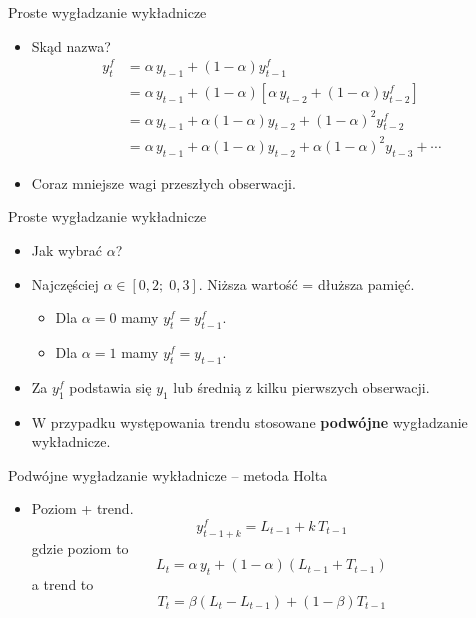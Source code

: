 \documentclass[11pt,usenames,dvipsnames,aspectratio=169]{beamer}
\begin{document}
\begin{frame}{Proste wygładzanie wykładnicze}
\begin{itemize}
    \item Skąd nazwa?
    \begin{align*}
    y_{t}^{f} &= \alpha\, y_{t-1}+\left(1-\alpha\right)y_{t-1}^{f}\\
     &= \alpha\, y_{t-1}+\left(1-\alpha\right)\!\left[\alpha\, y_{t-2}+\left(1-\alpha\right)y_{t-2}^{f}\right]\\
     &= \alpha\, y_{t-1}+\alpha\left(1-\alpha\right)y_{t-2}+\left(1-\alpha\right)^{2}y_{t-2}^{f}\\
     &= \alpha\, y_{t-1}+\alpha\left(1-\alpha\right)y_{t-2}+\alpha\left(1-\alpha\right)^{2}y_{t-3}+\cdots
    \end{align*}
    \item Coraz mniejsze wagi przeszłych obserwacji.
\end{itemize}
\end{frame}

\begin{frame}{Proste wygładzanie wykładnicze}
\begin{itemize}
    \item Jak wybrać $\alpha$?
    \item Najczęściej $\alpha\in\left[0{,}2;\;0{,}3\right]$. Niższa wartość = dłuższa pamięć.
    \begin{itemize}
        \item Dla $\alpha=0$ mamy $y_{t}^{f}=y_{t-1}^{f}$.
        \item Dla $\alpha=1$ mamy $y_{t}^{f}=y_{t-1}$.
    \end{itemize}
    \item Za $y_{1}^{f}$ podstawia się $y_{1}$ lub średnią z kilku pierwszych obserwacji.
    \item W przypadku występowania trendu stosowane \textbf{podwójne} wygładzanie wykładnicze.
\end{itemize}
\end{frame}

\begin{frame}{Podwójne wygładzanie wykładnicze -- metoda Holta}
\begin{itemize}
    \item Poziom + trend.
    \[
    y_{t-1+k}^{f}=L_{t-1}+k\,T_{t-1}
    \]
    gdzie poziom to
    \[
    L_{t}=\alpha\, y_{t}+\left(1-\alpha\right)\!\left(L_{t-1}+T_{t-1}\right)
    \]
    a trend to
    \[
    T_{t}=\beta\left(L_{t}-L_{t-1}\right)+\left(1-\beta\right)T_{t-1}
    \]
\end{itemize}
\end{frame}
\end{document}
